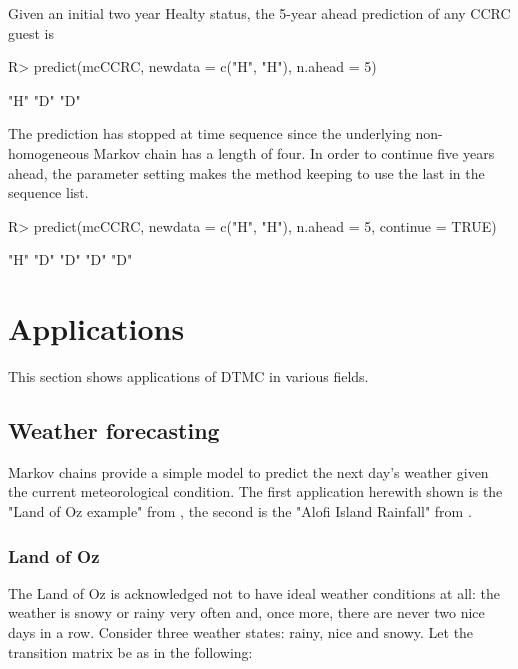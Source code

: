 \documentclass[nojss]{jss}
\begin{document}
Given an initial two year Healty status, the 5-year ahead prediction of any
CCRC guest is

\begin{Schunk}
\begin{Sinput}
R> predict(mcCCRC, newdata = c("H", "H"), n.ahead = 5)
\end{Sinput}
\begin{Soutput}
[1] "H" "D" "D"
\end{Soutput}
\end{Schunk}

The prediction has stopped at time sequence since the underlying
non-homogeneous Markov chain has a length of four. In order to continue five
years ahead, the  parameter setting makes the 
method keeping to use the last  in the sequence list.


\begin{Schunk}
\begin{Sinput}
R> predict(mcCCRC, newdata = c("H", "H"), n.ahead = 5, continue = TRUE)
\end{Sinput}
\begin{Soutput}
[1] "H" "D" "D" "D" "D"
\end{Soutput}
\end{Schunk}

\section{Applications}\label{sec:applications}

This section shows applications of DTMC in various
fields.

\subsection{Weather forecasting}\label{app:weather}

Markov chains provide a simple model to predict the next day's weather given the
current meteorological condition.
The first application herewith shown is the "Land of Oz example" from \cite{landOfOz}, the second is the "Alofi Island Rainfall" from \cite{averyHenderson}.

\subsubsection{Land of Oz}\label{sec:wfLandOfOz}

The Land of Oz is 
acknowledged not to have ideal weather conditions at all: 
the weather is snowy or rainy very often and, once more, there are never two
nice days in a row. Consider three weather states: rainy, nice and snowy. Let the transition matrix be as in the following:
\end{document}
